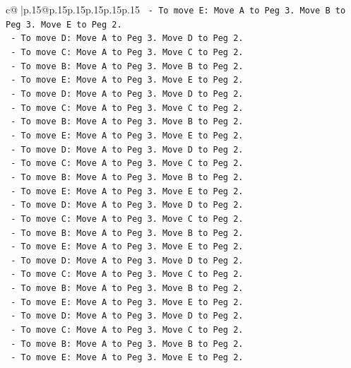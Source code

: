 \documentclass{article}
\begin{document}
{\begin{supertabular}{c@{$\;$}|p{.15\linewidth}@{}p{.15\linewidth}p{.15\linewidth}p{.15\linewidth}p{.15\linewidth}p{.15\linewidth}}
{{{\texttt{    {-}   To move E: Move A to Peg 3. Move B to Peg 3. Move E to Peg 2.} \\
\texttt{    {-}   To move D: Move A to Peg 3. Move D to Peg 2.} \\
\texttt{    {-}   To move C: Move A to Peg 3. Move C to Peg 2.} \\
\texttt{    {-}   To move B: Move A to Peg 3. Move B to Peg 2.} \\
\texttt{    {-}   To move E: Move A to Peg 3. Move E to Peg 2.} \\
\texttt{    {-}   To move D: Move A to Peg 3. Move D to Peg 2.} \\
\texttt{    {-}   To move C: Move A to Peg 3. Move C to Peg 2.} \\
\texttt{    {-}   To move B: Move A to Peg 3. Move B to Peg 2.} \\
\texttt{    {-}   To move E: Move A to Peg 3. Move E to Peg 2.} \\
\texttt{    {-}   To move D: Move A to Peg 3. Move D to Peg 2.} \\
\texttt{    {-}   To move C: Move A to Peg 3. Move C to Peg 2.} \\
\texttt{    {-}   To move B: Move A to Peg 3. Move B to Peg 2.} \\
\texttt{    {-}   To move E: Move A to Peg 3. Move E to Peg 2.} \\
\texttt{    {-}   To move D: Move A to Peg 3. Move D to Peg 2.} \\
\texttt{    {-}   To move C: Move A to Peg 3. Move C to Peg 2.} \\
\texttt{    {-}   To move B: Move A to Peg 3. Move B to Peg 2.} \\
\texttt{    {-}   To move E: Move A to Peg 3. Move E to Peg 2.} \\
\texttt{    {-}   To move D: Move A to Peg 3. Move D to Peg 2.} \\
\texttt{    {-}   To move C: Move A to Peg 3. Move C to Peg 2.} \\
\texttt{    {-}   To move B: Move A to Peg 3. Move B to Peg 2.} \\
\texttt{    {-}   To move E: Move A to Peg 3. Move E to Peg 2.} \\
\texttt{    {-}   To move D: Move A to Peg 3. Move D to Peg 2.} \\
\texttt{    {-}   To move C: Move A to Peg 3. Move C to Peg 2.} \\
\texttt{    {-}   To move B: Move A to Peg 3. Move B to Peg 2.} \\
\texttt{    {-}   To move E: Move A to Peg 3. Move E to Peg 2.} \\
}}}
\end{supertabular}}
\end{document}
